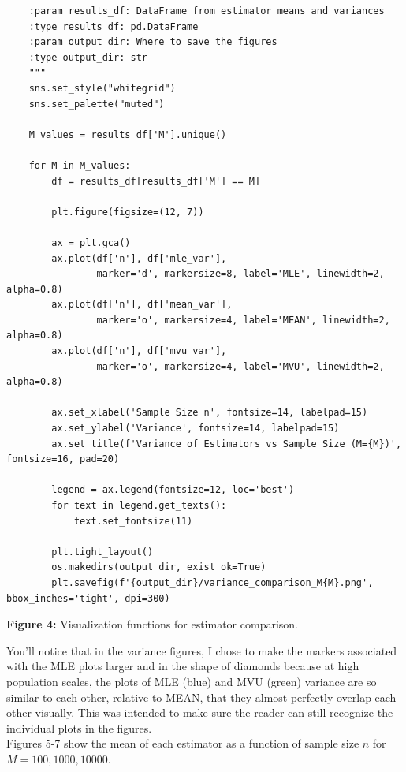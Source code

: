 \begin{verbatim}
    :param results_df: DataFrame from estimator means and variances
    :type results_df: pd.DataFrame
    :param output_dir: Where to save the figures
    :type output_dir: str
    """
    sns.set_style("whitegrid")
    sns.set_palette("muted")
    
    M_values = results_df['M'].unique()
    
    for M in M_values:
        df = results_df[results_df['M'] == M]
        
        plt.figure(figsize=(12, 7))
        
        ax = plt.gca()
        ax.plot(df['n'], df['mle_var'], 
                marker='d', markersize=8, label='MLE', linewidth=2, alpha=0.8)
        ax.plot(df['n'], df['mean_var'], 
                marker='o', markersize=4, label='MEAN', linewidth=2, alpha=0.8)
        ax.plot(df['n'], df['mvu_var'], 
                marker='o', markersize=4, label='MVU', linewidth=2, alpha=0.8)
        
        ax.set_xlabel('Sample Size n', fontsize=14, labelpad=15)
        ax.set_ylabel('Variance', fontsize=14, labelpad=15)
        ax.set_title(f'Variance of Estimators vs Sample Size (M={M})', fontsize=16, pad=20)
        
        legend = ax.legend(fontsize=12, loc='best')
        for text in legend.get_texts():
            text.set_fontsize(11)
        
        plt.tight_layout()
        os.makedirs(output_dir, exist_ok=True)
        plt.savefig(f'{output_dir}/variance_comparison_M{M}.png', bbox_inches='tight', dpi=300)
\end{verbatim}

\begin{center}
\textbf{Figure 4:} Visualization functions for estimator comparison.\\
\end{center}

You'll notice that in the variance figures, I chose to make the markers associated with the MLE plots larger and in the shape of diamonds because at high population scales, the plots of MLE (blue) and MVU (green) variance are so similar to each other, relative to MEAN, that they almost perfectly overlap each other visually. This was intended to make sure the reader can still recognize the individual plots in the figures.\\

Figures 5-7 show the mean of each estimator as a function of sample size $n$ for $ M=100, 1000, 10000 $.

